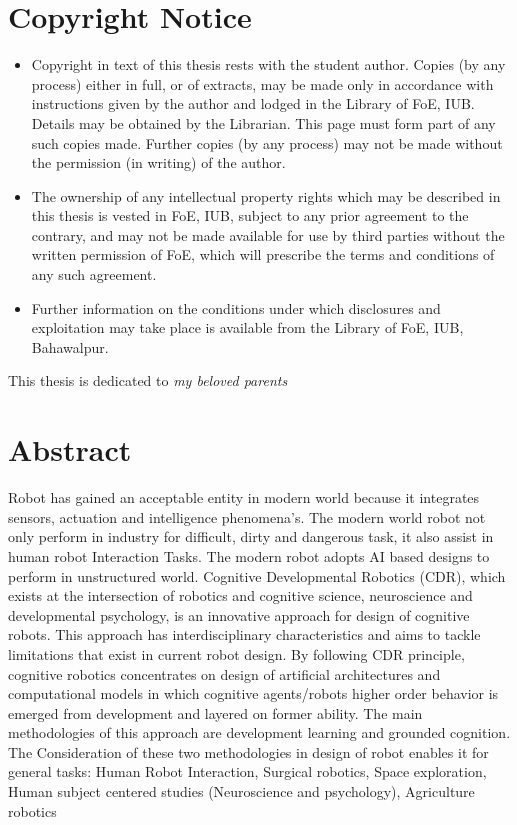 \documentclass[11pt,a4paper]{report}
\numberwithin{equation}{section}
\begin{document}
    \chapter*{Copyright Notice} %
    \label{cha:copyright_notice}
    \begin{itemize}
        \item Copyright in text of this thesis rests with the student author. Copies (by any process) either in full, or of extracts, may be made only in accordance with instructions given by the author and lodged in the Library of FoE, IUB. Details may be obtained by the Librarian. This page must form part of any such copies made. Further copies (by any process) may not be made without the permission (in writing) of the author.
        \item The ownership of any intellectual property rights which may be described in this thesis is vested in FoE, IUB, subject to any prior agreement to the contrary, and may not be made available for use by third parties without the written permission of FoE, which will prescribe the terms and conditions of any such agreement.
        \item Further information on the conditions under which disclosures and exploitation may take place is available from the Library of FoE, IUB, Bahawalpur.
    \end{itemize}

    \newpage
    \vspace*{8cm}
    \begin{center}
        \Large This thesis is dedicated to \emph{my beloved parents}
    \end{center}

    \newpage
    \chapter*{Abstract}
Robot has gained an acceptable entity in modern world because it integrates sensors, actuation and intelligence phenomena’s. The modern world robot not only perform in industry for difficult, dirty and dangerous task, it also assist in human robot Interaction Tasks. The modern robot adopts AI based designs to perform in unstructured world.  Cognitive Developmental Robotics (CDR), which exists at the intersection of robotics and cognitive science, neuroscience and developmental psychology, is an innovative approach for design of cognitive robots. This approach has interdisciplinary characteristics and aims to tackle limitations that exist in current robot design. By following CDR principle, cognitive robotics concentrates on design of artificial architectures and computational models in which cognitive agents/robots higher order behavior is emerged from development and layered on former ability. The main methodologies of this approach are development learning and grounded cognition. The Consideration of these two methodologies in design of robot enables it for general tasks: Human Robot Interaction, Surgical robotics, Space exploration, Human subject centered studies (Neuroscience and psychology), Agriculture robotics
\end{document}
